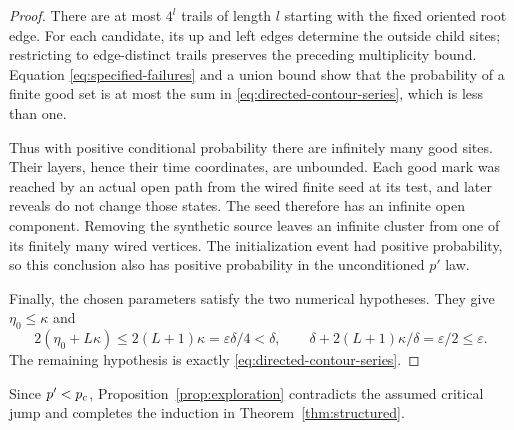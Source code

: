 \begin{proof}
There are at most $4^l$ trails of length $l$ starting with the fixed
oriented root edge. For each candidate, its up and left edges
determine the outside child sites; restricting to edge-distinct
trails preserves the preceding multiplicity bound. Equation
\eqref{eq:specified-failures} and a union bound show that the
probability of a finite good set is at most the sum in
\eqref{eq:directed-contour-series}, which is less than one.

Thus with positive conditional probability there are infinitely
many good sites. Their layers, hence their time coordinates, are
unbounded. Each good mark was reached by an actual open path from
the wired finite seed at its test, and later reveals do not change
those states. The seed therefore has an infinite open component.
Removing the synthetic source leaves an infinite cluster from one
of its finitely many wired vertices. The initialization event had
positive probability, so this conclusion also has positive
probability in the unconditioned $p'$ law.

Finally, the chosen parameters satisfy the two numerical hypotheses.
They give $\eta_0\le\kappa$ and
\[
 2(\eta_0+L\kappa)\le2(L+1)\kappa
   =\varepsilon\delta/4<\delta,
 \qquad
 \delta+2(L+1)\kappa/\delta=\varepsilon/2\le\varepsilon.
\]
The remaining hypothesis is exactly
\eqref{eq:directed-contour-series}.
\end{proof}

Since $p'<p_c$, Proposition~\ref{prop:exploration} contradicts the
assumed critical jump and completes the induction in
Theorem~\ref{thm:structured}.
